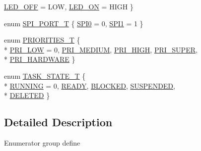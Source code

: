 \begin{DoxyCompactItemize}
\hyperlink{group___enumerations_gga6f24594071a026b31238ab8cb80d6a80afc0ca8cc6cbe215fd3f1ae6d40255b40}{L\-E\-D\-\_\-\-O\-F\-F} = L\-O\-W, 
\hyperlink{group___enumerations_gga6f24594071a026b31238ab8cb80d6a80add01b80eb93658fb4cf7eb9aceb89a1d}{L\-E\-D\-\_\-\-O\-N} = H\-I\-G\-H
 \}
\item 
enum \hyperlink{group___enumerations_ga1adbe6bf70e3880dc6b9f86e58bb7f98}{S\-P\-I\-\_\-\-P\-O\-R\-T\-\_\-\-T} \{ \hyperlink{group___enumerations_gga1adbe6bf70e3880dc6b9f86e58bb7f98a7add1e0588a075d9385b10fcbb2010f4}{S\-P\-I0} = 0, 
\hyperlink{group___enumerations_gga1adbe6bf70e3880dc6b9f86e58bb7f98add83ddb396fbcb33f2d61248e5c4a185}{S\-P\-I1} = 1
 \}
\item 
enum \hyperlink{group___enumerations_ga51e24e4c0498282f564e92975e020c1d}{P\-R\-I\-O\-R\-I\-T\-I\-E\-S\-\_\-\-T} \{ \\*
\hyperlink{group___enumerations_gga51e24e4c0498282f564e92975e020c1daf8a2513dc9a78bb09c0520af65a3f402}{P\-R\-I\-\_\-\-L\-O\-W} = 0, 
\hyperlink{group___enumerations_gga51e24e4c0498282f564e92975e020c1da79f9a58f2b2fb4dcce4589cd93a5e3f8}{P\-R\-I\-\_\-\-M\-E\-D\-I\-U\-M}, 
\hyperlink{group___enumerations_gga51e24e4c0498282f564e92975e020c1dae366c91784dd520e388c90d0e3770b2b}{P\-R\-I\-\_\-\-H\-I\-G\-H}, 
\hyperlink{group___enumerations_gga51e24e4c0498282f564e92975e020c1dae497885a7abaca97e8daf75b84bb67da}{P\-R\-I\-\_\-\-S\-U\-P\-E\-R}, 
\\*
\hyperlink{group___enumerations_gga51e24e4c0498282f564e92975e020c1da47d8cd9e6c142378614cf48f5ecd78e5}{P\-R\-I\-\_\-\-H\-A\-R\-D\-W\-A\-R\-E}
 \}
\item 
enum \hyperlink{group___enumerations_ga25ee4013cc565a18ac2f4039b4ad441b}{T\-A\-S\-K\-\_\-\-S\-T\-A\-T\-E\-\_\-\-T} \{ \\*
\hyperlink{group___enumerations_gga25ee4013cc565a18ac2f4039b4ad441ba1061be6c3fb88d32829cba6f6b2be304}{R\-U\-N\-N\-I\-N\-G} = 0, 
\hyperlink{group___enumerations_gga25ee4013cc565a18ac2f4039b4ad441ba6564f2f3e15be06b670547bbcaaf0798}{R\-E\-A\-D\-Y}, 
\hyperlink{group___enumerations_gga25ee4013cc565a18ac2f4039b4ad441ba376c1b6a3f75d283a2efacf737438d61}{B\-L\-O\-C\-K\-E\-D}, 
\hyperlink{group___enumerations_gga25ee4013cc565a18ac2f4039b4ad441ba1c2114335a42993ac5cc5dbf65f83d41}{S\-U\-S\-P\-E\-N\-D\-E\-D}, 
\\*
\hyperlink{group___enumerations_gga25ee4013cc565a18ac2f4039b4ad441baae88752b9379248f07e2c3fdc064d998}{D\-E\-L\-E\-T\-E\-D}
 \}
\end{DoxyCompactItemize}


\subsection{Detailed Description}
Enumerator group define 

